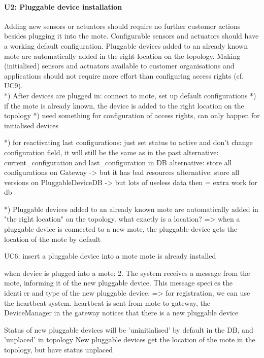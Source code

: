     \paragraph{U2: Pluggable device installation}
        Adding new sensors or actuators should require no further customer
        actions besides plugging it into the mote. Configurable sensors and
        actuators should have a working default configuration.
        Pluggable devices added to an already known mote are automatically
        added in the right location on the topology.
        Making (initialised) sensors and actuators available to customer
        organisations and applications should not require more effort than
        configuring access rights (cf. UC9). \\
        *) After devices are plugged in: connect to mote, set up default configurations
        *) if the mote is already known, the device is added to the right location on the topology
        *) need something for configuration of access rights, can only happen for initialised devices

        *) for reactivating last configurations: just set status to active and don't change configuration field, it will still be the same as in the past
            alternative: current\_configuration and last\_configuration in DB
            alternative: store all configurations on Gateway -> but it has bad resources
            alternative: store all versions on PluggableDeviceDB -> but lots of useless data then = extra work for db

        *) Pluggable devices added to an already known mote are automatically added in "the right location" on the topology.
            what exactly is a location?
            => when a pluggable device is connected to a new mote, the pluggable device gets the location of the mote by default

        UC6: insert a pluggable device into a mote
            mote is already installed

            when device is plugged into a mote:
                2. The system receives a message from the mote, informing it of the new pluggable device. This
                message species the identier and type of the new pluggable device.
                => for registration, we can use the heartbeat system. heartbeat is sent from mote to gateway,
                the DeviceManager in the gateway notices that there is a new pluggable device

                Status of new pluggable devices will be 'uninitialised' by default in the DB, and 'unplaced' in topology
                New pluggable devices get the location of the mote in the topology, but have status unplaced

